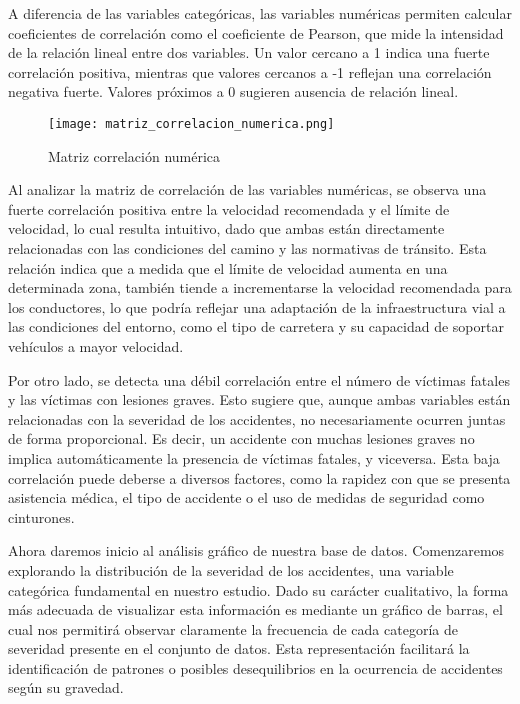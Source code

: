 \documentclass{book}
\begin{document}
A diferencia de las variables categóricas, las variables numéricas permiten calcular coeficientes de correlación como el coeficiente de Pearson, que mide la intensidad de la relación lineal entre dos variables. Un valor cercano a 1 indica una fuerte correlación positiva, mientras que valores cercanos a -1 reflejan una correlación negativa fuerte. Valores próximos a 0 sugieren ausencia de relación lineal.

\begin{figure}[htbp]
\centering
\texttt{[image: matriz\_correlacion\_numerica.png]}
\caption{\label{fig:matriz correlacion numerica}Matriz correlación numérica}
\end{figure}

Al analizar la matriz de correlación de las variables numéricas, se observa una fuerte correlación positiva entre la velocidad recomendada y el límite de velocidad, lo cual resulta intuitivo, dado que ambas están directamente relacionadas con las condiciones del camino y las normativas de tránsito. Esta relación indica que a medida que el límite de velocidad aumenta en una determinada zona, también tiende a incrementarse la velocidad recomendada para los conductores, lo que podría reflejar una adaptación de la infraestructura vial a las condiciones del entorno, como el tipo de carretera y su capacidad de soportar vehículos a mayor velocidad.

Por otro lado, se detecta una débil correlación entre el número de víctimas fatales y las víctimas con lesiones graves. Esto sugiere que, aunque ambas variables están relacionadas con la severidad de los accidentes, no necesariamente ocurren juntas de forma proporcional. Es decir, un accidente con muchas lesiones graves no implica automáticamente la presencia de víctimas fatales, y viceversa. Esta baja correlación puede deberse a diversos factores, como la rapidez con que se presenta asistencia médica, el tipo de accidente o el uso de medidas de seguridad como cinturones.

Ahora daremos inicio al análisis gráfico de nuestra base de datos. Comenzaremos explorando la distribución de la severidad de los accidentes, una variable categórica fundamental en nuestro estudio. Dado su carácter cualitativo, la forma más adecuada de visualizar esta información es mediante un gráfico de barras, el cual nos permitirá observar claramente la frecuencia de cada categoría de severidad presente en el conjunto de datos. Esta representación facilitará la identificación de patrones o posibles desequilibrios en la ocurrencia de accidentes según su gravedad.
\end{document}

